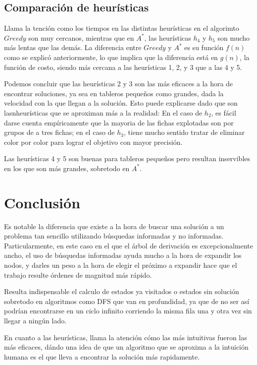 \documentclass[%
    final,
    reprint,
    notitlepage,
    narroweqnarray,
    inline,
    twoside,
    invited
    ]{ieee}
\begin{document}
\subsection{Comparaci\'on de heur\'isticas}
\par Llama la tenci\'on como los tiempos en las distintas heur\'isticas en el algorimto $Greedy$ son muy cercanos, mientras que en $A^*$, las heur\'isticas $h_4$ y $h_5$ son mucho m\'as lentas que las dem\'as. La diferencia entre $Greedy$ y $A^*$ es su funci\'on $f(n)$ como se explic\'o anteriormente, lo que implica que la diferencia est\'a en $g(n)$, la funci\'on de costo, siendo m\'as cercana a las heur\'isticas 1, 2, y 3 que a las 4 y 5.\\
\par Podemos concluir que las heur\'isticas 2 y 3 son las m\'as eficaces a la hora de encontrar soluciones, ya sea en tableros peque\~nos como grandes, dada la velocidad con la que llegan a la soluci\'on. Esto puede explicarse dado que son lasnheur\'isticas que se aproximan m\'as a la realidad: En el caso de $h_2$, es f\'acil darse cuenta emp\'iricamente que la mayoria de las fichas explotadas son por grupos de a tres fichas; en el caso de $h_3$, tiene mucho sentido tratar de eliminar color por color para lograr el objetivo con mayor precisi\'on.\\
\par Las heur\'isticas 4 y 5 son buenas para tableros peque\~nos pero resultan inservibles en los que son m\'as grandes, sobretodo en $A^*$.\\
\newpage
\section{Conclusi\'on}
Es notable la diferencia que existe a la hora de buscar una soluci\'on a un problema tan sencillo utilizando b\'usquedas informadas y no informadas. Particularmente, en este caso en el que el \'arbol de derivaci\'on es excepcionalmente ancho, el uso de b\'usquedas informadas ayuda mucho a la hora de expandir los nodos, y darles un peso a la hora de elegir el pr\'oximo a expandir hace que el trabajo resulte \'ordenes de magnitud m\'as r\'apido.\\
\par Resulta indispensable el calculo de estados ya visitados o estados sin soluci\'on sobretodo en algoritmos como DFS que van en profundidad, ya que de no ser as\'i podr\'ian encontrarse en un ciclo infinito corriendo la misma fila una y otra vez sin llegar a ning\'un lado.\\
\par En cuanto a las heur\'isticas, llama la atenci\'on c\'omo las m\'as intuitivas fueron las m\'as eficaces, d\'ando una idea de que un algoritmo que se aproxima a la intuici\'on humana es el que lleva a encontrar la soluci\'on m\'as rapidamente.
\newpage 
\end{document}

